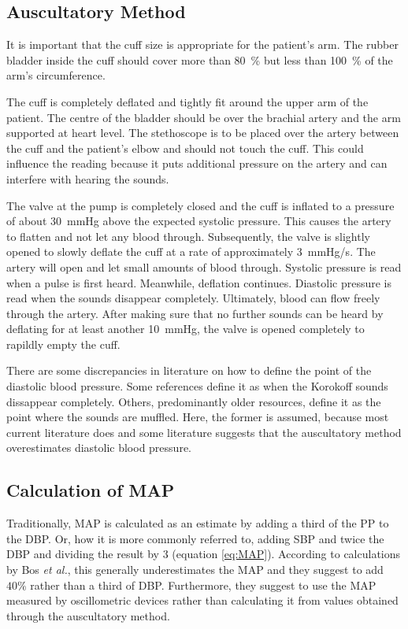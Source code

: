\subsection{Auscultatory Method}
It is important that the cuff size is appropriate for the patient's arm. The rubber bladder inside the cuff should cover more than \SI{80}{\%} but less than \SI{100}{\%} of the arm's circumference.

The cuff is completely deflated and tightly fit around the upper arm of the patient. The centre of the bladder should be over the brachial artery and the arm supported at heart level. The stethoscope is to be placed over the artery between the cuff and the patient's elbow and should not touch the cuff. This could influence the reading because it puts additional pressure on the artery and can interfere with hearing the sounds.\cite{NHS2019}\cite{Reeves1995}

The valve at the pump is completely closed and the cuff is inflated to a pressure of about \SI{30}{\mmHg} above the expected systolic pressure. This causes the artery to flatten and not let any blood through. Subsequently, the valve is slightly opened to slowly deflate the cuff at a rate of approximately \SI{3}{\mmHg/\second}. The artery will open and let small amounts of blood through. Systolic pressure is read when a pulse is first heard. Meanwhile, deflation continues. Diastolic pressure is read when the sounds disappear completely. Ultimately, blood can flow freely through the artery. After making sure that no further sounds can be heard by deflating for at least another \SI{10}{\mmHg}, the valve is opened completely to rapildly empty the cuff.   \cite{NHS2019,Reeves1995}

There are some discrepancies in literature on how to define the point of the diastolic blood pressure. Some references define it as when the Korokoff sounds dissappear completely. \cite{NHS2019,Reeves1995} Others, predominantly older resources, define it as the point where the sounds are muffled.\cite{Boron2012} Here, the former is assumed, because most current literature does and some literature suggests that the auscultatory method overestimates diastolic blood pressure. \cite{Chandrasekhar2019}

\subsection{Calculation of MAP}
Traditionally, MAP is calculated as an estimate by adding a third of the PP to the DBP. Or, how it is more commonly referred to, adding SBP and twice the DBP and dividing the result by 3 (equation \ref{eq:MAP}). According to calculations by Bos \textit{et al.}, this generally underestimates the MAP and they suggest to add $40\%$ rather than a third of DBP. Furthermore, they suggest to use the MAP measured by oscillometric devices rather than calculating it from values obtained through the auscultatory method. \cite{Bos2007}

